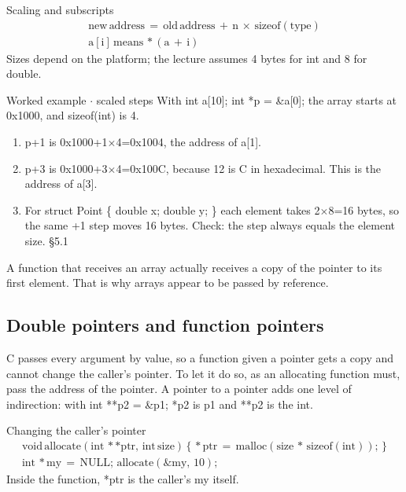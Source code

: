 \documentclass[11pt]{article}
\begin{document}
\begin{keepsection}
\begin{keepsection}
\begin{equationcard}{Scaling and subscripts}
\[ \begin{gathered} \text{new}\, \text{address}\, =\, \text{old}\, \text{address}\, +\, \mathrm{n}\, \times \, \text{sizeof}(\text{type}) \\ \mathrm{a}[\mathrm{i}]\, \text{means}\, *(\mathrm{a}\, +\, \mathrm{i}) \end{gathered} \]
{\small Sizes depend on the platform; the lecture assumes 4 bytes for int and 8 for double.}
\end{equationcard}

\begin{workedbox}{Worked example \ensuremath{\cdot} scaled steps}
With int a[10]; int *p = \&a[0]; the array starts at 0x1000, and sizeof(int) is 4.

\begin{enumerate}
\item p+1 is 0x1000+1\ensuremath{\times}4=0x1004, the address of a[1].
\item p+3 is 0x1000+3\ensuremath{\times}4=0x100C, because 12 is C in hexadecimal. This is the address of a[3].
\item For struct Point \{ double x; double y; \} each element takes 2\ensuremath{\times}8=16 bytes, so the same +1 step moves 16 bytes. Check: the step always equals the element size. \hfill{\small\color{FAUblue}§5.1}
\end{enumerate}
\end{workedbox}

A function that receives an array actually receives a copy of the pointer to its first element. That is why arrays appear to be passed by reference.
\end{keepsection}

\begin{keepsection}
\subsection{Double pointers and function pointers}

C passes every argument by value, so a function given a pointer gets a copy and cannot change the caller’s pointer. To let it do so, as an allocating function must, pass the address of the pointer. A pointer to a pointer adds one level of indirection: with int **p2 = \&p1; *p2 is p1 and **p2 is the int.

\begin{equationcard}{Changing the caller’s pointer}
\[ \begin{gathered} \text{void}\, \text{allocate}(\text{int}\, **\text{ptr},\, \text{int}\, \text{size})\, \{\, *\text{ptr}\, =\, \text{malloc}(\text{size}\, *\, \text{sizeof}(\text{int}));\, \} \\ \text{int}\, *\text{my}\, =\, \text{NULL};\, \text{allocate}(\&\text{my},\, 10); \end{gathered} \]
{\small Inside the function, *ptr is the caller’s my itself.}
\end{equationcard}


\end{keepsection}
\end{keepsection}
\end{document}
